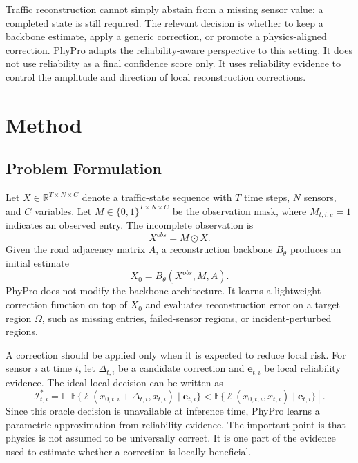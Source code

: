 \documentclass[preprint,12pt]{elsarticle}
\begin{document}
Traffic reconstruction cannot simply abstain from a missing sensor value; a completed state is still required. The relevant decision is whether to keep a backbone estimate, apply a generic correction, or promote a physics-aligned correction. PhyPro adapts the reliability-aware perspective to this setting. It does not use reliability as a final confidence score only. It uses reliability evidence to control the amplitude and direction of local reconstruction corrections.

\section{Method}

\subsection{Problem Formulation}
Let $X \in \mathbb{R}^{T \times N \times C}$ denote a traffic-state sequence with $T$ time steps, $N$ sensors, and $C$ variables. Let $M \in \{0,1\}^{T \times N \times C}$ be the observation mask, where $M_{t,i,c}=1$ indicates an observed entry. The incomplete observation is
\begin{equation}
  X^{obs}=M \odot X .
\end{equation}
Given the road adjacency matrix $A$, a reconstruction backbone $B_{\theta}$ produces an initial estimate
\begin{equation}
  X_0 = B_{\theta}(X^{obs},M,A).
\end{equation}
PhyPro does not modify the backbone architecture. It learns a lightweight correction function on top of $X_0$ and evaluates reconstruction error on a target region $\Omega$, such as missing entries, failed-sensor regions, or incident-perturbed regions.

A correction should be applied only when it is expected to reduce local risk. For sensor $i$ at time $t$, let $\Delta_{t,i}$ be a candidate correction and $\mathbf{e}_{t,i}$ be local reliability evidence. The ideal local decision can be written as
\begin{equation}
  \mathcal{I}^{*}_{t,i}
  =
  \mathbb{I}
  \left[
  \mathbb{E}\{\ell(x_{0,t,i}+\Delta_{t,i},x_{t,i}) \mid \mathbf{e}_{t,i}\}
  <
  \mathbb{E}\{\ell(x_{0,t,i},x_{t,i}) \mid \mathbf{e}_{t,i}\}
  \right].
\end{equation}
Since this oracle decision is unavailable at inference time, PhyPro learns a parametric approximation from reliability evidence. The important point is that physics is not assumed to be universally correct. It is one part of the evidence used to estimate whether a correction is locally beneficial.
\end{document}
